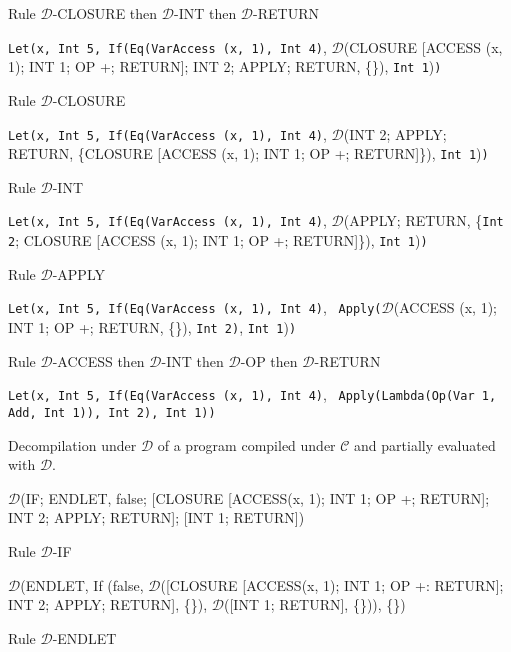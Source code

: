 \documentclass[11pt]{article}
\begin{document}
\begin{landscape}
{\smallskip
\noindent Rule $\mathcal{D}$-CLOSURE then $\mathcal{D}$-INT then $\mathcal{D}$-RETURN
\smallskip

\noindent \texttt{Let(x, Int 5, If(Eq(VarAccess (x, 1), Int 4)}, $\mathcal{D}$(CLOSURE [ACCESS (x, 1); INT 1; OP +; RETURN]; INT 2; APPLY; RETURN, \{\}), \texttt{Int 1})\texttt{)}

\smallskip
\noindent Rule $\mathcal{D}$-CLOSURE
\smallskip

\noindent \texttt{Let(x, Int 5, If(Eq(VarAccess (x, 1), Int 4)}, $\mathcal{D}$(INT 2; APPLY; RETURN, \{CLOSURE [ACCESS (x, 1); INT 1; OP +; RETURN]\}), \texttt{Int 1})\texttt{)}

\smallskip
\noindent Rule $\mathcal{D}$-INT
\smallskip

\noindent \texttt{Let(x, Int 5, If(Eq(VarAccess (x, 1), Int 4)}, $\mathcal{D}$(APPLY; RETURN, \{\texttt{Int 2}; CLOSURE [ACCESS (x, 1); INT 1; OP +; RETURN]\}), \texttt{Int 1})\texttt{)}

\smallskip
\noindent Rule $\mathcal{D}$-APPLY
\smallskip

\noindent \texttt{Let(x, Int 5, If(Eq(VarAccess (x, 1), Int 4)}, \ \texttt{Apply(}$\mathcal{D}$(ACCESS (x, 1); INT 1; OP +; RETURN, \{\}), \texttt{Int 2)}, \texttt{Int 1})\texttt{)}

\smallskip
\noindent Rule $\mathcal{D}$-ACCESS then $\mathcal{D}$-INT then $\mathcal{D}$-OP then $\mathcal{D}$-RETURN
\smallskip

\noindent \texttt{Let(x, Int 5, If(Eq(VarAccess (x, 1), Int 4)}, \ \texttt{Apply(Lambda(Op(Var 1, Add, Int 1)), \texttt{Int 2)}, \texttt{Int 1})\texttt{)}}

}

\newpage

{\small

\noindent Decompilation under $\mathcal{D}$ of a program compiled under $\mathcal{C}$ and partially evaluated with $\mathcal{D}$.

\bigskip

\noindent $\mathcal{D}$(IF; ENDLET, {false; [CLOSURE [ACCESS(x, 1); INT 1; OP +; RETURN]; INT 2; APPLY; RETURN]; [INT 1; RETURN]})

\smallskip
\noindent Rule $\mathcal{D}$-IF
\smallskip

\noindent $\mathcal{D}$(ENDLET, If (false, $\mathcal{D}$([CLOSURE [ACCESS(x, 1); INT 1; OP +: RETURN]; INT 2; APPLY; RETURN], \{\}), $\mathcal{D}$([INT 1; RETURN], \{\})), \{\})

\smallskip
\noindent Rule $\mathcal{D}$-ENDLET
\smallskip

}
\end{landscape}
\end{document}
